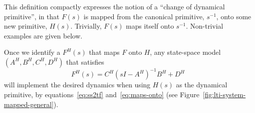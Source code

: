 This definition compactly expresses the notion of a ``change of dynamical primitive'', in that $F(s)$ is mapped from the canonical primitive, $s^{-1}$, onto some new primitive, $H(s)$.
Trivially, $F(s)$ maps itself onto $s^{-1}$.
Non-trivial examples are given below.

Once we identify a $F^{H}(s)$ that maps $F$ onto $H$, any state-space model $\left( A^H\text{,}\, B^H\text{,}\, C^H\text{,}\, D^H \right)$ that satisfies
\begin{equation} \label{eq:ss-mapped}
F^{H} \left( s \right) = C^H \left( sI - A^H \right)^{-1}B^H + D^H
\end{equation}
will implement the desired dynamics when using $H(s)$ as the dynamical primitive, by equations~\ref{eq:ss2tf} and~\ref{eq:maps-onto} (see Figure~\ref{fig:lti-system-mapped-general}).

